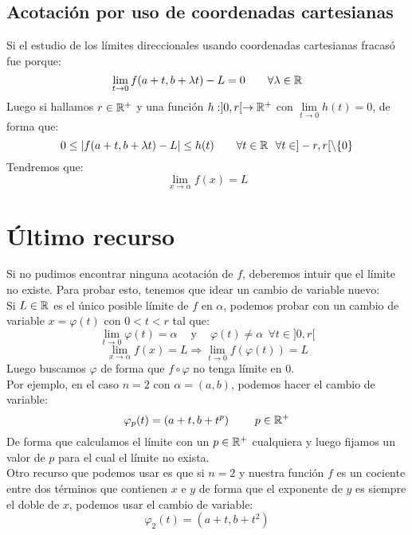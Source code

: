 \subsection{Acotación por uso de coordenadas cartesianas}

Si el estudio de los límites direccionales usando coordenadas cartesianas fracasó fue porque:
$$\lim_{t \to 0}f(a + t, b + \lambda t)-L = 0~~~~~~\forall \lambda \in \mathbb R$$
Luego si hallamos $r \in \mathbb R^{+}$ y una función $h:]0,r[\rightarrow \mathbb R^{+}$ con $\lim\limits_{t\to 0}h(t) = 0$,
de forma que:
$$0 \leq |f(a+t,b+\lambda t)-L| \leq h(t)~~~~~~\forall t \in \mathbb R~~\forall t \in ]-r,r[\setminus\{0\}$$
Tendremos que: $$\lim_{x \to \alpha}f(x) = L$$

\section{Último recurso}

Si no pudimos encontrar ninguna acotación de $f$, deberemos intuir que el límite no existe.
Para probar esto, tenemos que idear un cambio de variable nuevo:\\


Si $L \in \mathbb R$ es el único posible límite de $f$ en $\alpha$, podemos probar con un cambio de variable
$x = \varphi(t)$ con $0 < t < r$ tal que:
$$\lim_{t \to 0}\varphi(t) = \alpha ~~~~\mbox{ y } ~~~~ \varphi(t) \neq \alpha ~~\forall t \in ]0,r[$$
$$\lim_{x \to \alpha}f(x) = L \Rightarrow \lim_{t \to 0}f(\varphi(t)) = L$$
Luego buscamos $\varphi$ de forma que $f \circ \varphi$ no tenga límite en 0.\\


Por ejemplo, en el caso $n=2$ con $\alpha = (a,b)$, podemos hacer el cambio de variable:
$$\varphi_p(t)=(a+t, b+t^p)~~~~~~~p \in \mathbb R^{+}$$
De forma que calculamos el límite con un $p \in \mathbb R^{+}$ cualquiera y luego fijamos un valor de $p$
para el cual el límite no exista.\\


Otro recurso que podemos usar es que si $n=2$ y nuestra función $f$ es un cociente entre dos
términos que contienen $x$ e $y$ de forma que el exponente de $y$ es siempre el doble de $x$, podemos
usar el cambio de variable:
$$\varphi_2(t) = (a+t,b+t^2)$$

